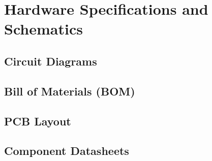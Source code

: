\chapter{Hardware Specifications and Schematics}
\label{appendix:hardware}




\section{Circuit Diagrams}





\section{Bill of Materials (BOM)}




\section{PCB Layout}



\section{Component Datasheets}

